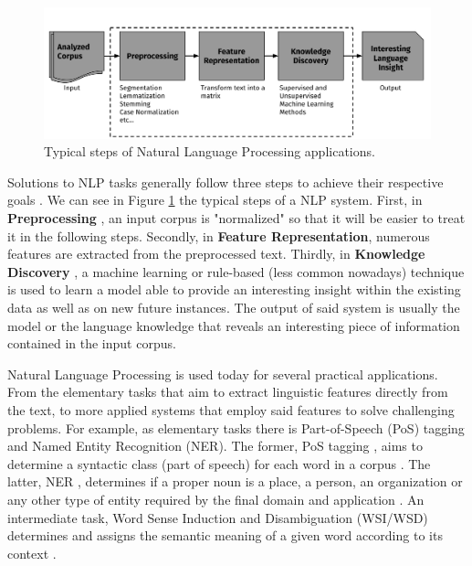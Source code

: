 %
\begin{figure}
\centering
\includegraphics[width=1\linewidth]{./images/Chapitre1/nlp_flow.pdf}
\caption{Typical steps of Natural Language Processing applications.}
\label{fig:nlpflow}
\end{figure}
Solutions to NLP tasks generally follow three steps to achieve their respective goals \cite{mining12Book,JurafskyM09}. We can see in Figure \ref{fig:nlpflow}  the typical steps of a NLP system.  First, in \textbf{Preprocessing} , an input corpus is "normalized" so that it will be easier to treat it in the following steps. Secondly, in \textbf{Feature Representation},  numerous features are extracted from the preprocessed text. Thirdly, in \textbf{Knowledge Discovery} ,  a machine learning or rule-based (less common nowadays) technique is used to  learn a model able to provide an interesting insight within the existing data as well as on new future instances. The output of said system is usually the model or the language knowledge that reveals an interesting piece of information contained in the input corpus. 

Natural Language Processing is used today for several practical applications. From the elementary tasks that aim to extract linguistic features directly from the text, to more applied systems that employ said features to solve challenging problems. For example, as elementary tasks there is Part-of-Speech (PoS) tagging and Named Entity Recognition (NER). The former, PoS tagging  , aims to determine a syntactic class (part of speech) for each word in a corpus \cite{JurafskyM09}. The latter, NER  , determines if a proper noun is a place, a person, an organization or any other type of entity required by the final domain and application \cite{nadeau2007survey} . An intermediate task, Word Sense Induction and Disambiguation (WSI/WSD) determines and assigns the semantic meaning of a given word according to its context  \cite{ClarkBook2010}.


